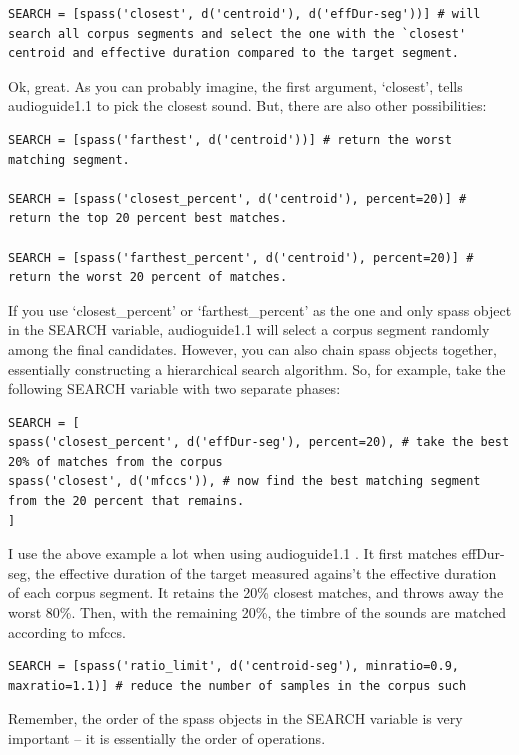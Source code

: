 \documentclass{article}
\newcommand{\ag}{audioguide1.1 }
\begin{document}
\begin{spacing}{1.2}
\begin{lstlisting}
SEARCH = [spass('closest', d('centroid'), d('effDur-seg'))] # will search all corpus segments and select the one with the `closest' centroid and effective duration compared to the target segment.
\end{lstlisting}

Ok, great.  As you can probably imagine, the first argument, `closest', tells \ag to pick the closest sound.  But, there are also other possibilities:

\begin{lstlisting}
SEARCH = [spass('farthest', d('centroid'))] # return the worst matching segment.

SEARCH = [spass('closest_percent', d('centroid'), percent=20)] # return the top 20 percent best matches.

SEARCH = [spass('farthest_percent', d('centroid'), percent=20)] # return the worst 20 percent of matches.
\end{lstlisting}

If you use `closest\_percent' or `farthest\_percent' as the one and only spass object in the SEARCH variable, \ag will select a corpus segment randomly among the final candidates.  However, you can also chain spass objects together, essentially constructing a hierarchical search algorithm.  So, for example, take the following SEARCH variable with two separate phases:

\begin{lstlisting}
SEARCH = [
spass('closest_percent', d('effDur-seg'), percent=20), # take the best 20% of matches from the corpus
spass('closest', d('mfccs')), # now find the best matching segment from the 20 percent that remains.
] 
\end{lstlisting}

I use the above example a lot when using \ag.  It first matches effDur-seg, the effective duration of the target measured agains't the effective duration of each corpus segment.  It retains the 20\% closest matches, and throws away the worst 80\%.  Then, with the remaining 20\%, the timbre of the sounds are matched according to mfccs.

\begin{lstlisting}
SEARCH = [spass('ratio_limit', d('centroid-seg'), minratio=0.9, maxratio=1.1)] # reduce the number of samples in the corpus such 
\end{lstlisting}

Remember, the order of the spass objects in the SEARCH variable is very important -- it is essentially the order of operations.


\end{spacing}
\end{document}
